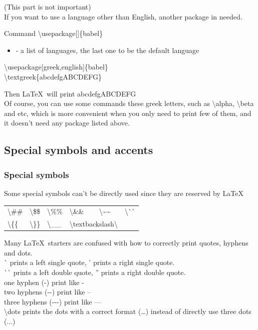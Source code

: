 \documentclass{beamer}
\newenvironment{command}{\begin{block}{Command}}{\end{block}}
\newcommand{\samplecommand}[1]{\alert{\textbackslash #1}}
\newcommand{\samplesymbol}[2]{\samplecommand{#1}\quad #2}
\begin{document}
\begin{frame}
	(This part is not important)\\
	If you want to use a language other than English, another package  in needed.
	\begin{command}
		\samplecommand{usepackage}[]\{babel\}
		\begin{itemize}
			\item {} - a list of languages, the last one to be the default language
		\end{itemize}
	\end{command}
	\begin{example}
		\samplecommand{usepackage}[greek,english]\{babel\}\\
		\samplecommand{textgreek}\{abcdefgABCDEFG\}\\
	\end{example}
	Then \LaTeX\ will print \textgreek{abcdefgABCDEFG}\\
	Of course, you can use some commands these greek letters, such as \samplecommand{alpha}, \samplecommand{beta} and etc, which is more convenient when you only need to print few of them, and it doesn't need any package listed above.
\end{frame}

\subsection{Special symbols and accents}

\begin{frame}
	\frametitle{Special symbols}
	Some special symbols can't be directly used since they are reserved by \LaTeX
	\begin{center}
	\begin{tabular}{llllll}
		\samplesymbol{\#}{\#} & \samplesymbol{\$}{\$} & \samplesymbol{\%}{\%} & \samplesymbol{\&}{\&} & \samplesymbol{\~{}}{\~{}} & \samplesymbol{\`{}}{\`{}} \\
		\samplesymbol{\{}{\{} & \samplesymbol{\}}{\}} & \samplesymbol{\_}{\_} &
		\multicolumn{2}{l}{\samplesymbol{textbackslash}{\textbackslash}}
	\end{tabular}
	\end{center}
	Many \LaTeX\ starters are confused with how to correctly print quotes, hyphens and dots.\\
	\`{} prints a left single quote, ' prints a right single quote.\\
	\`{}\`{} prints a left double quote, '' prints a right double quote.\\
	one hyphen (-) print like - \\
	two hyphens ({-}{-}) print like -- \\
	three hyphens ({-}{-}{-}) print like ---\\
	\samplecommand{dots} prints the dots with a correct format (\dots) instead of directly use three dots (...)
\end{frame}
\end{document}

